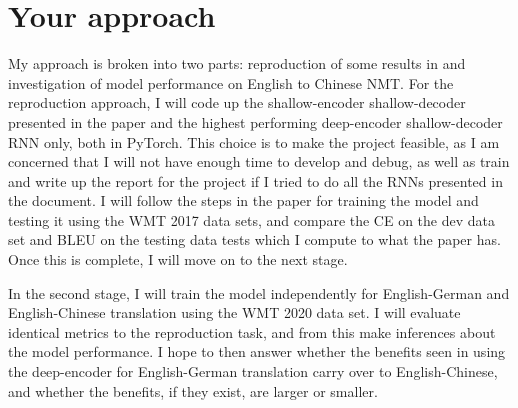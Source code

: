 \documentclass[11pt,letterpaper]{article}
\newcommand{\blue}[1]{\textcolor{RoyalBlue}{#1}}
\newcommand{\instructions}[1]{\blue{\textit{#1}}}
\renewcommand{\instructions}[1]{}
\begin{document}
\section*{Your approach} 
\instructions{Describe how you want to tackle this task}
My approach is broken into two parts: reproduction of some results in \cite{miceli-barone-etal-2017-deep} and investigation of model performance on English to Chinese NMT.
For the reproduction approach, I will code up the shallow-encoder shallow-decoder presented in the paper and the highest performing deep-encoder shallow-decoder RNN only, both in PyTorch.
This choice is to make the project feasible, as I am concerned that I will not have enough time to develop and debug, as well as train and write up the report for the project if I tried to do all the RNNs presented in the document. 
I will follow the steps in the paper for training the model and testing it using the WMT 2017 data sets, and compare the CE on the dev data set and BLEU on the testing data tests which I compute to what the paper has.
Once this is complete, I will move on to the next stage.

In the second stage, I will train the model independently for English-German and English-Chinese translation using the WMT 2020 data set.
I will evaluate identical metrics to the reproduction task, and from this make inferences about the model performance.
I hope to then answer whether the benefits seen in using the deep-encoder for English-German translation carry over to English-Chinese, and whether the benefits, if they exist, are larger or smaller.
\end{document}
